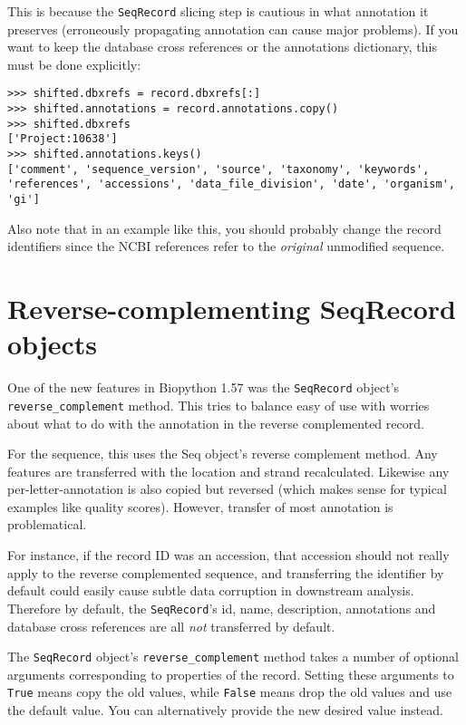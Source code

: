This is because the \verb|SeqRecord| slicing step is cautious in what annotation
it preserves (erroneously propagating annotation can cause major problems). If
you want to keep the database cross references or the annotations dictionary,
this must be done explicitly:

\begin{verbatim}
>>> shifted.dbxrefs = record.dbxrefs[:]
>>> shifted.annotations = record.annotations.copy()
>>> shifted.dbxrefs
['Project:10638']
>>> shifted.annotations.keys()
['comment', 'sequence_version', 'source', 'taxonomy', 'keywords', 'references', 'accessions', 'data_file_division', 'date', 'organism', 'gi']
\end{verbatim}

Also note that in an example like this, you should probably change the record
identifiers since the NCBI references refer to the \emph{original} unmodified
sequence.

\section{Reverse-complementing SeqRecord objects}
\label{sec:SeqRecord-reverse-complement}

One of the new features in Biopython 1.57 was the \verb|SeqRecord| object's
\verb|reverse_complement| method. This tries to balance easy of use with worries
about what to do with the annotation in the reverse complemented record.

For the sequence, this uses the Seq object's reverse complement method. Any
features are transferred with the location and strand recalculated. Likewise
any per-letter-annotation is also copied but reversed (which makes sense for
typical examples like quality scores). However, transfer of most annotation
is problematical.

For instance, if the record ID was an accession, that accession should not really
apply to the reverse complemented sequence, and transferring the identifier by
default could easily cause subtle data corruption in downstream analysis.
Therefore by default, the \verb|SeqRecord|'s id, name, description, annotations
and database cross references are all \emph{not} transferred by default.

The \verb|SeqRecord| object's \verb|reverse_complement| method takes a number
of optional arguments corresponding to properties of the record. Setting these
arguments to \verb|True| means copy the old values, while \verb|False| means
drop the old values and use the default value. You can alternatively provide
the new desired value instead.

